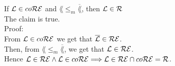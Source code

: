 If $\lang \in co\REcl$ and $\lang \leq_m \overline{\lang}$, then $\lang \in \Rcl$ \\
The claim is true. \\

Proof: \\
From $\lang \in co\REcl$ we get that $\overline{\lang} \in \REcl$.  \\
Then, from $\lang \leq_m \overline{\lang}$, we get that $\lang \in \REcl$. \\
Hence $\lang \in \REcl \wedge \lang \in co\REcl \Longrightarrow \lang \in \REcl \cap co\REcl = \Rcl$. \\
